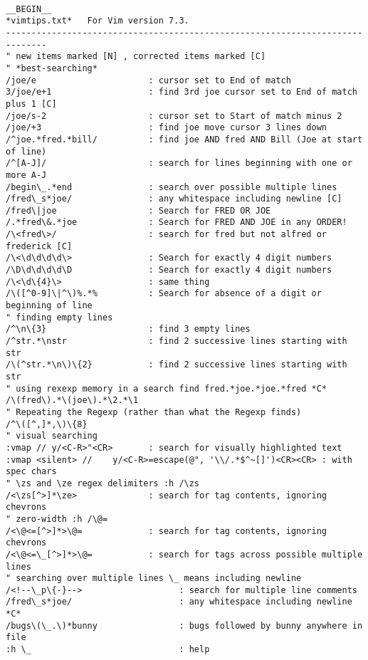 \documentclass[10pt,landscape]{article}
\begin{document}
\newpage

\begin{multicols}{2}
\begin{verbatim}

__BEGIN__
*vimtips.txt*	For Vim version 7.3.  
------------------------------------------------------------------------------
" new items marked [N] , corrected items marked [C]
" *best-searching*
/joe/e                      : cursor set to End of match
3/joe/e+1                   : find 3rd joe cursor set to End of match plus 1 [C]
/joe/s-2                    : cursor set to Start of match minus 2
/joe/+3                     : find joe move cursor 3 lines down
/^joe.*fred.*bill/          : find joe AND fred AND Bill (Joe at start of line)
/^[A-J]/                    : search for lines beginning with one or more A-J
/begin\_.*end               : search over possible multiple lines
/fred\_s*joe/               : any whitespace including newline [C]
/fred\|joe                  : Search for FRED OR JOE
/.*fred\&.*joe              : Search for FRED AND JOE in any ORDER!
/\<fred\>/                  : search for fred but not alfred or frederick [C]
/\<\d\d\d\d\>               : Search for exactly 4 digit numbers
/\D\d\d\d\d\D               : Search for exactly 4 digit numbers
/\<\d\{4}\>                 : same thing
/\([^0-9]\|^\)%.*%          : Search for absence of a digit or beginning of line
" finding empty lines
/^\n\{3}                    : find 3 empty lines
/^str.*\nstr                : find 2 successive lines starting with str
/\(^str.*\n\)\{2}           : find 2 successive lines starting with str
" using rexexp memory in a search find fred.*joe.*joe.*fred *C*
/\(fred\).*\(joe\).*\2.*\1
" Repeating the Regexp (rather than what the Regexp finds)
/^\([^,]*,\)\{8}
" visual searching
:vmap // y/<C-R>"<CR>       : search for visually highlighted text
:vmap <silent> //    y/<C-R>=escape(@", '\\/.*$^~[]')<CR><CR> : with spec chars
" \zs and \ze regex delimiters :h /\zs
/<\zs[^>]*\ze>              : search for tag contents, ignoring chevrons
" zero-width :h /\@=
/<\@<=[^>]*>\@=             : search for tag contents, ignoring chevrons
/<\@<=\_[^>]*>\@=           : search for tags across possible multiple lines
" searching over multiple lines \_ means including newline
/<!--\_p\{-}-->                   : search for multiple line comments
/fred\_s*joe/                     : any whitespace including newline *C*
/bugs\(\_.\)*bunny                : bugs followed by bunny anywhere in file
:h \_                             : help

\end{verbatim}
\end{multicols}
\end{document}
